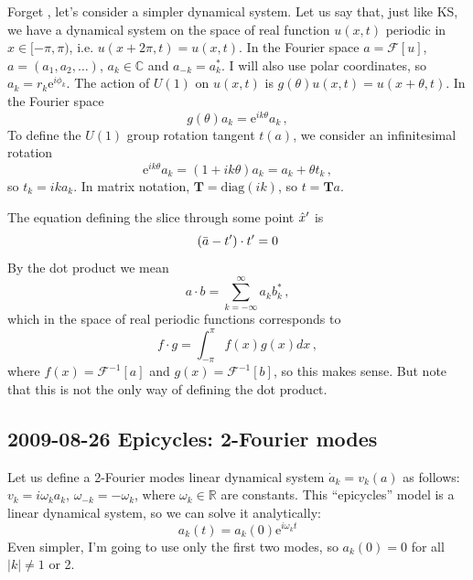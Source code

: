 
\medskip{} Forget \KS, let's consider a simpler dynamical system.
Let us say that, just like KS, we have a dynamical system on the space of real function $u(x,t)$ periodic in $x \in [-\pi, \pi)$, i.e. $u(x+2\pi,t) = u(x,t)$.  In the Fourier space $a = \mathcal{F}[u]$, $a = (a_1, a_2, \ldots)$, $a_k \in \mathbb{C}$ and $a_{-k} = a_k^\ast$.
I will also use polar coordinates, so $a_k = r_k \mathrm{e}^{i \phi_k}$.
The action of $U(1)$ on $u(x,t)$ is $g(\theta) u(x,t) = u(x+\theta,t)$. In the Fourier space
\[ g(\theta) a_k = \mathrm{e}^{ik\theta}a_k\,, \]
To define the $U(1)$ group rotation tangent $t(a)$, we consider an infinitesimal rotation
\[ \mathrm{e}^{ik\theta}a_k = (1 + ik\theta)a_k  = a_k + \theta t_k\,, \]
so $t_k = ika_k$.
In matrix notation, $\mathbf{T} = \mathrm{diag}(ik)$,
    so  $t = \mathbf{T}a$.

The equation defining the slice through some point ${\hat{x}'}$ is
\[ (\bar{a} - t'_{}) \cdot t'_{} = 0 \]
By the dot product we mean
\[ a \cdot b = \sum_{k=-\infty}^\infty a_k b_k^*\,, \]
which in the space of real periodic functions corresponds to
\[ f \cdot g = \int_{-\pi}^\pi f(x) g(x) dx\,, \]
where $f(x) = \mathcal{F}^{-1}[a]$ and $g(x) = \mathcal{F}^{-1}[b]$,
so this makes sense.  But note that this is not
the only way of defining the dot product.

\subsection{2009-08-26 Epicycles: 2-Fourier modes}
\label{sect:epyc2Fourier}

\medskip{}
Let us define a 2-Fourier modes linear dynamical system
$\dot{a}_k = v_k(a)$ as follows: $v_k = i \omega_k a_k$,
$\omega_{-k} = -\omega_k$, where $\omega_k \in \mathbb{R}$ are
constants.
This
     {``epicycles'' model}
is a linear dynamical system, so we can solve it analytically:
\[ a_k(t) = a_k(0) \mathrm{e}^{i \omega_k t} \]
Even simpler, I'm going to use only the first two modes, so $a_k(0) = 0$ for all $|k| \neq 1$ or 2.

